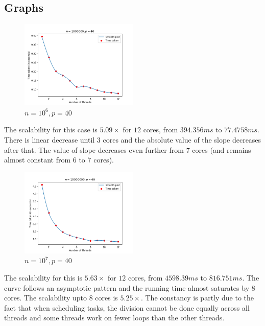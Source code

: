 \documentclass[11pt]{article}
\begin{document}
\subsection{Graphs}
\begin{figure}[H]
	\begin{center}
		\includegraphics[width=0.5\textwidth]{outputs/1e6_40_t12.png}
	\end{center}
	\caption{$n = 10^6, p = 40$}
	\label{fig:1e6_40}
\end{figure}
The scalability for this case is $5.09\times$ for $12$ cores, from $394.356ms$ to $77.4758ms$. There is linear decrease until $3$ cores and the absolute value of the slope decreases after that. The value of slope decreases even further from $7$ cores (and remains almost constant from $6$ to $7$ cores).

\begin{figure}[H]
	\begin{center}
		\includegraphics[width=0.5\textwidth]{outputs/1e7_40_t12.png}
	\end{center}
	\caption{$n = 10^7, p = 40$}
	\label{fig:1e7_40}
\end{figure}
The scalability for this is $5.63\times$ for $12$ cores, from $4598.39ms$ to $816.751ms$. The curve follows an asymptotic pattern and the running time almost saturates by $8$ cores. The scalability upto $8$ cores is $5.25\times$. The constancy is partly due to the fact that when scheduling tasks, the division cannot be done equally across all threads and some threads work on fewer loops than the other threads.
\end{document}
